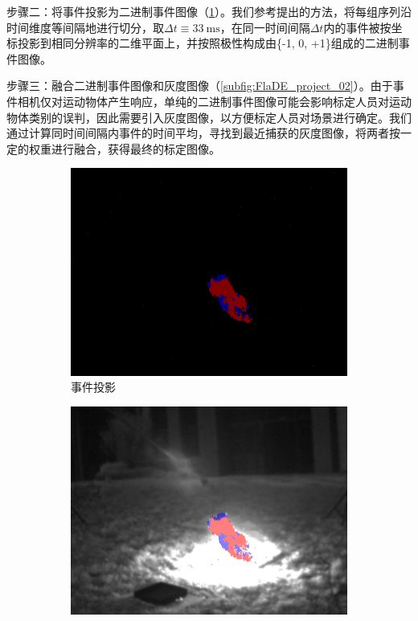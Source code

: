 步骤二：将事件投影为二进制事件图像（\ref{subfig:FlaDE_project_01}）。我们参考\citet{kogler2009bio}提出的方法，将每组序列沿时间维度等间隔地进行切分，取$\Delta{t} \equiv \SI{33}{\milli\second}$，在同一时间间隔$\Delta{t}$内的事件被按坐标投影到相同分辨率的二维平面上，并按照极性构成由\{-1, 0, +1\}组成的二进制事件图像。

步骤三：融合二进制事件图像和灰度图像（\ref{subfig:FlaDE_project_02}）。由于事件相机仅对运动物体产生响应，单纯的二进制事件图像可能会影响标定人员对运动物体类别的误判，因此需要引入灰度图像，以方便标定人员对场景进行确定。我们通过计算同时间间隔内事件的时间平均，寻找到最近捕获的灰度图像，将两者按一定的权重进行融合，获得最终的标定图像。

\begin{figure}[ht]
    \centering
    \begin{subfigure}{0.49\textwidth}
        \centering
        \includegraphics[width=\textwidth]{figures/dataset_project_01.png}
        \caption{事件投影}
        \label{subfig:FlaDE_project_01}
    \end{subfigure}
    \hfill
    \begin{subfigure}{0.49\textwidth}
        \centering
        \includegraphics[width=\textwidth]{figures/dataset_project_02.png}

\end{subfigure}
\end{figure}
